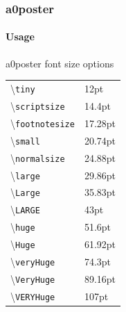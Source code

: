 \documentclass[11pt]{beamer}
\begin{document}
\begin{frame}
\frametitle{a0poster}\framesubtitle{Usage}
		\begin{block}{a0poster font size options}
		\footnotesize
			\begin{tabular}{l l}
				\textbackslash \verb|tiny| & 12pt\\
				\textbackslash \verb|scriptsize| & 14.4pt\\
				\textbackslash \verb|footnotesize| & 17.28pt\\
				\textbackslash \verb|small| & 20.74pt\\
				\textbackslash \verb|normalsize| & 24.88pt\\
				\textbackslash \verb|large| & 29.86pt\\
				\textbackslash \verb|Large| & 35.83pt\\
				\textbackslash \verb|LARGE| & 43pt\\
				\textbackslash \verb|huge| & 51.6pt\\
				\textbackslash \verb|Huge| & 61.92pt\\
				\textbackslash \verb|veryHuge| & 74.3pt\\
				\textbackslash \verb|VeryHuge| & 89.16pt\\
				\textbackslash \verb|VERYHuge| & 107pt\\
			\end{tabular}
		\normalsize
			
		\end{block}		
		
\end{frame}
\end{document}
